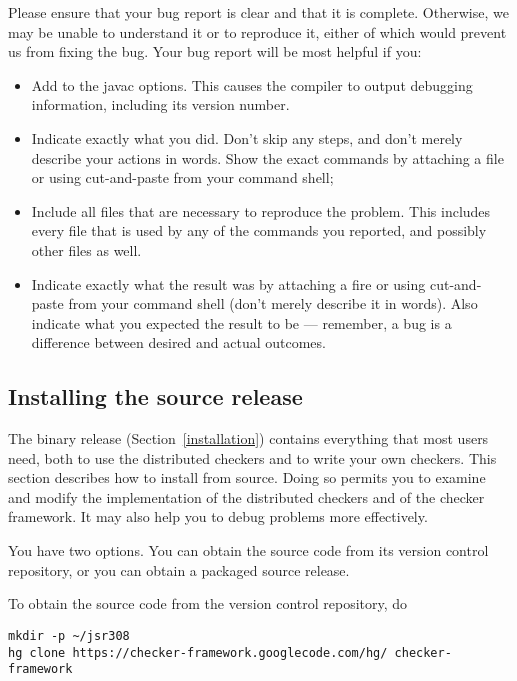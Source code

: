 Please ensure that your bug report is clear and that it is complete.
Otherwise, we may be unable to understand it or to reproduce it, either of
which would prevent us from fixing the bug.  Your bug report will be most
helpful if you:

\begin{itemize}
\item
  Add  to the javac options.  This causes the compiler to output
  debugging information, including its version number.
\item
  Indicate exactly what you did.  Don't skip any steps, and don't merely
  describe your actions in words.  Show the exact commands by attaching a
  file or using cut-and-paste from your command shell;
\item
  Include all files that are necessary to reproduce the problem.  This
  includes every file that is used by any of the commands you reported, and
  possibly other files as well.
\item
  Indicate exactly what the result was by attaching a fire or using
  cut-and-paste from your command shell (don't merely describe it in
  words).  Also indicate what you expected the result to be --- remember, a
  bug is a difference between desired and actual outcomes.
\end{itemize}


\subsection{Installing the source release\label{install-source}}

The binary release (Section~\ref{installation}) contains everything that
most users need, both to use the distributed checkers and to write your own
checkers.  This section describes how to install from source.  Doing
so permits you to examine and modify the implementation of the distributed
checkers and of the checker framework.  It may also help you to debug
problems more effectively.

You have two options.  You can obtain the source code from its version
control repository, or you can obtain a packaged source release.

To obtain the source code from the version control repository, do

\begin{Verbatim}
mkdir -p ~/jsr308
hg clone https://checker-framework.googlecode.com/hg/ checker-framework
\end{Verbatim}


